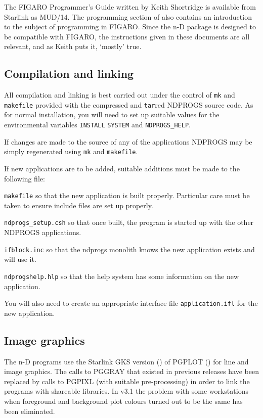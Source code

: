 The FIGARO Programmer's Guide written by Keith Shortridge is available
from Starlink as MUD/14. The programming section of
 also contains an
introduction to the subject of programming in FIGARO. Since the n-D package is
designed to be compatible with FIGARO, the instructions given in these
documents are all relevant, and as Keith puts it, `mostly' true.


\subsection{Compilation and linking}

All compilation and linking is best carried out under the control of
{\tt mk} and {\tt makefile} provided with the compressed and {\tt tar}red
NDPROGS source code. As for normal installation, you will need
to set up suitable values for the environmental variables {\tt INSTALL}
{\tt SYSTEM} and {\tt NDPROGS\_HELP}.

If changes are made to the source of any of the
applications NDPROGS may be simply regenerated using {\tt mk} and {\tt makefile}.

If new applications are to be added, suitable additions must be made to
the following file:

{\tt makefile} so that the new application is built
properly. Particular care must be taken to ensure include files
are set up properly.

{\tt ndprogs\_setup.csh} so that once built, the program is started up with the
other NDPROGS applications.

{\tt ifblock.inc} so that the ndprogs monolith knows the new application exists
and will use it.

{\tt ndprogshelp.hlp} so that the help system has some information on the new
application.

You will also need to create an appropriate interface file
{\tt application.ifl} for
the new application.


\subsection{Image graphics}
\label{image}

The n-D programs use the Starlink GKS version () of PGPLOT
() for line and image
graphics. The calls to PGGRAY that existed in previous releases have been
replaced by calls to PGPIXL (with suitable pre-processing) in order to link
the programs with shareable libraries. In v3.1 the problem with some
workstations when foreground and background plot colours turned out to be the
same has been eliminated.

